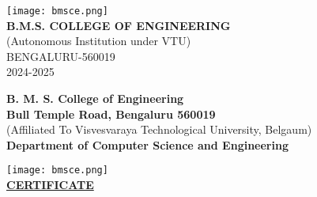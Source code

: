 \begin{titlepage}
    \vspace{1cm}
    
    \texttt{[image: bmsce.png]} \\
    \vspace{0.5cm}
    {\Large \textbf{B.M.S. COLLEGE OF ENGINEERING}} \\[0.5em]
    {\large (Autonomous Institution under VTU)} \\[0.5em]
    { BENGALURU-560019} \\[0.5em]
    { 2024-2025} \\
    

\end{titlepage}

\clearpage


    \begin{center}
    
    {\Large \textbf{B. M. S. College of Engineering}}\\[0.25em]
    {\large \textbf{Bull Temple Road, Bengaluru 560019}}\\[0.25em]
    
    (Affiliated To Visvesvaraya Technological University, Belgaum)\\[0.25em]
    \textbf{Department of Computer Science and Engineering}
        

    \vspace{0.75cm}
    \texttt{[image: bmsce.png]}\\
    \vspace{0.75cm}
    \textbf{\Large \underline{CERTIFICATE}}\\
    \vspace{0.5cm}
    \end{center}

